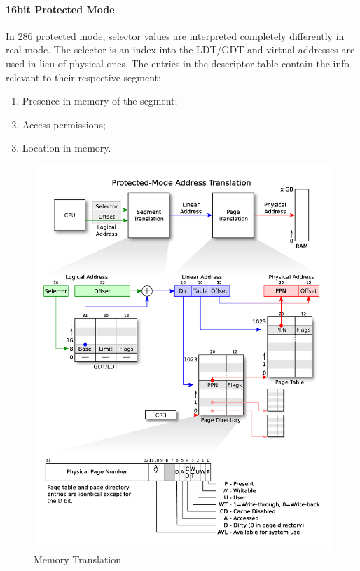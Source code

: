 \paragraph{16bit Protected Mode}
In 286 protected mode, selector values are interpreted completely differently in real mode. The selector is an index into the LDT/GDT and virtual addresses are used in lieu of physical ones. The entries in the descriptor table contain the info relevant to their respective segment: 
\begin{enumerate}
    \item Presence in memory of the segment; 
    \item Access permissions; 
    \item Location in memory.
\end{enumerate} 
\begin{figure} 
    \begin{center}
        \includegraphics[scale=0.5]{./pics/x86_translation.pdf}
        \caption{Memory Translation}
        \label{memtrans}
    \end{center} 
\end{figure}
